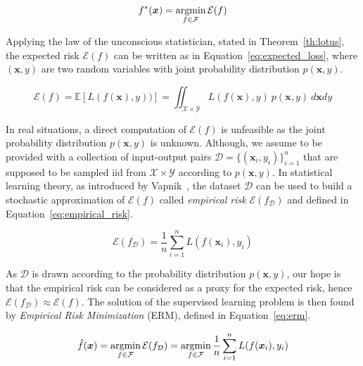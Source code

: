 \begin{equation} \label{eq:fstar}
	f^*(\bm{x}) = \mathop{\mathrm{argmin}}\limits_{f \in \mathcal{F}}{\mathcal{E}(f)}
\end{equation}

Applying the law of the unconscious statistician, stated in Theorem~\ref{th:lotus}, the expected risk $\mathcal{E}(f)$ can be written as in Equation~\eqref{eq:expected_loss}, where $(\bm{x},y)$ are two random variables with joint probability distribution $p(\bm{x},y)$.

\begin{equation} \label{eq:expected_loss}
	\mathcal{E}(f) = \mathbb{E}[L(f(\bm{x}),y))] = \iint_{\mathcal{X} \times \mathcal{Y}}L(f(\bm{x}),y)~p(\bm{x},y)~d\bm{x}dy
\end{equation}

In real situations, a direct computation of $\mathcal{E}(f)$ is unfeasible as the joint probability distribution $p(\bm{x},y)$ is unknown. Although, we assume to be provided with a collection of input-output pairs $\mathcal{D}=\{(\bm{x}_i,y_i)\}_{i=1}^n$ that are supposed to be sampled \ac{iid} from $\mathcal{X} \times \mathcal{Y}$ according to $p(\bm{x}, y)$.
In statistical learning theory, as introduced by Vapnik~\cite{vapnik2013nature}, the dataset $\mathcal{D}$ can be used to build a stochastic approximation of $\mathcal{E}(f)$ called \textit{empirical risk} $\mathcal{E}(f_{\mathcal{D}})$ and defined in Equation~\eqref{eq:empirical_risk}.

\begin{equation} \label{eq:empirical_risk}
	\mathcal{E}(f_{\mathcal{D}}) = \frac{1}{n} \sum_{i=1}^{n} L(f(\bm{x}_i), y_i)
\end{equation}

As $\mathcal{D}$ is drawn according to the probability distribution $p(\bm{x},y)$, our hope is that the empirical risk can be considered as a proxy for the expected risk, hence $\mathcal{E}(f_{\mathcal{D}}) \approx \mathcal{E}(f)$. The solution of the supervised learning problem is then found by \textit{Empirical Risk Minimization} (ERM), defined in Equation~\eqref{eq:erm}.

\begin{equation} \label{eq:erm}
	\hat f(\bm{x}) = \mathop{\mathrm{argmin}}\limits_{f \in \mathcal{F}}{\mathcal{E}(f_{\mathcal{D}})} = \mathop{\mathrm{argmin}}\limits_{f \in \mathcal{F}}{\frac{1}{n} \sum_{i=1}^{n} L(f(\bm{x}_i), y_i)}
\end{equation}


